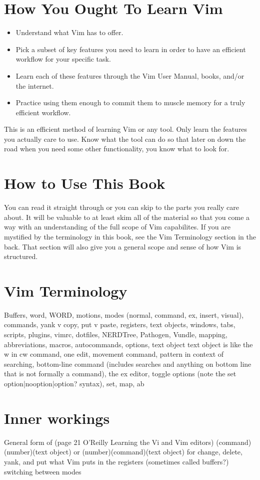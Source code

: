 \documentclass[12pt]{book}
\begin{document}
\section{How You Ought To Learn Vim}
\begin{itemize}
\item Understand what Vim has to offer.
\item Pick a subset of key features you need to learn in order to have an efficient workflow for your specific task.
\item Learn each of these features through the Vim User Manual, books, and/or the internet.
\item Practice using them enough to commit them to muscle memory for a truly efficient workflow. 
\end{itemize}
This is an efficient method of learning Vim or any tool. 
Only learn the features you actually care to use. 
Know what the tool can do so that later on down the road when you need some other functionality, you know what to look for.

\section{How to Use This Book}
You can read it straight through or you can skip to the parts you really care about.  
It will be valuable to at least skim all of the material so that you come a way with an understanding of the full scope of Vim capabilites.
If you are mystified by the terminology in this book, see the Vim Terminology section in the back.
That section will also give you a general scope and sense of how Vim is structured.

\section{Vim Terminology}
Buffers, word, WORD, motions, modes (normal, command, ex, insert, visual), commands, yank v copy, put v paste, registers, text objects, windows, tabs, scripts, plugins, vimrc, dotfiles,
NERDTree, Pathogen, Vundle, mapping, abbreviations, macros, autocommands, options, text object text object is like the w in cw command, one edit, movement command, pattern in context of 
searching, bottom-line command (includes searches and anything on bottom line that is not formally a command), the ex editor, toggle options (note the set option|nooption|option? syntax), 
set, map, ab

\section{Inner workings}
General form of (page 21 O'Reilly Learning the Vi and Vim editors) (command)(number)(text object) or (number)(command)(text object) for change, delete, yank, and put
what Vim puts in the registers (sometimes called buffers?)
switching between modes
\end{document}
